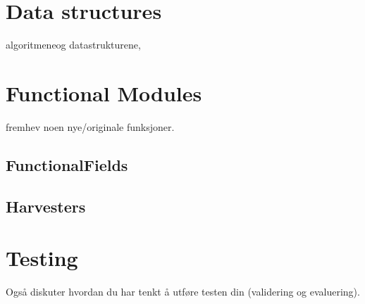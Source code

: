 \section{Data structures}\label{impl:Data structures}
algoritmeneog datastrukturene,

\section{Functional Modules}\label{impl:Functional Modules}
fremhev noen nye/originale funksjoner.
\subsection{FunctionalFields}
\subsection{Harvesters}

\section{Testing}\label{impl:Testing}
Også diskuter hvordan du har tenkt å utføre testen din (validering og evaluering).
